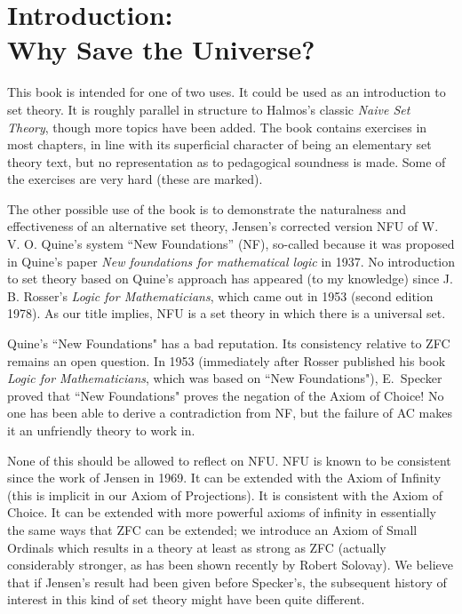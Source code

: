 \chapter[Introduction:  Why Save the Universe?]{Introduction:\\
Why Save the Universe?}


This book is intended for one of two uses.  It could be used as an
introduction to set theory.  It is roughly parallel in structure to
Halmos's classic {\itshape Naive Set Theory\/}, though more topics have
been added.  The book contains exercises in most chapters, in line
with its superficial character of being an elementary set theory text,
but no representation as to pedagogical soundness is made.  Some of
the exercises are very hard (these are marked).

The other possible use of the book is to demonstrate the naturalness
and effectiveness of an alternative set theory, Jensen's corrected
version NFU of W. V. O. Quine's system ``New
Foundations'' (NF), so-called because it was proposed in Quine's paper
{\itshape New foundations for mathematical logic} in 1937.  No introduction to
set theory based on Quine's approach has appeared (to my knowledge) since
J. B. Rosser's {\itshape Logic for Mathematicians\/}, which came out in
1953 (second edition 1978).  As our title implies, NFU is a
set theory in which there is a universal set.

Quine's ``New Foundations" has a bad reputation.  Its
consistency relative to ZFC
remains an open question.
In 1953 (immediately after Rosser published his book {\itshape Logic for
Mathematicians\/}, which was based on ``New Foundations"), E.~Specker
proved that ``New Foundations" proves the negation of the Axiom of
Choice!  No one has been able to derive a contradiction
from NF, but the failure of AC makes it an unfriendly theory to work in.

None of this should be allowed to reflect on NFU.  
NFU is known to be consistent since the work of Jensen in 1969.  It can be
extended with the Axiom of Infinity (this is implicit in our
Axiom of Projections).  It is consistent with the
Axiom of Choice.  It can be extended with more powerful axioms of infinity in
essentially the same ways that ZFC can be extended; we introduce an Axiom of Small
Ordinals which results in a theory at least as
strong as ZFC
(actually considerably stronger, as has been shown recently by Robert
Solovay).  We believe that if Jensen's result had been given before
Specker's, the subsequent history of interest in this kind of set
theory might have been quite different.

